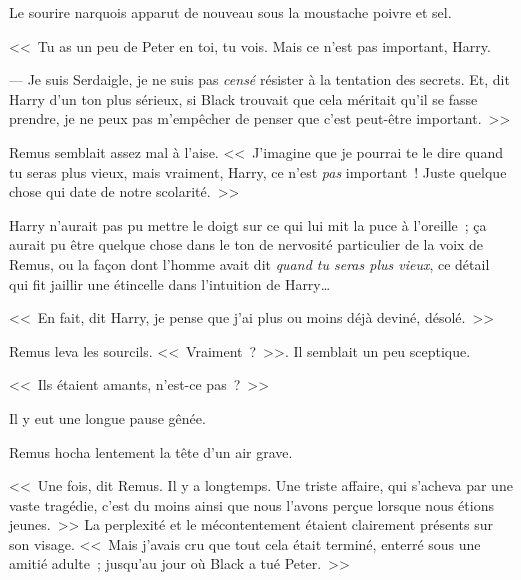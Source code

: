 Le sourire narquois apparut de nouveau sous la moustache poivre et sel.

<<~Tu as un peu de Peter en toi, tu vois. Mais ce n'est pas important, Harry.

--- Je suis Serdaigle, je ne suis pas \emph{censé} résister à la tentation des secrets. Et, dit Harry d'un ton plus sérieux, si Black trouvait que cela méritait qu'il se fasse prendre, je ne peux pas m'empêcher de penser que c'est peut-être important.~>>

Remus semblait assez mal à l'aise. <<~J'imagine que je pourrai te le dire quand tu seras plus vieux, mais vraiment, Harry, ce n'est \emph{pas} important~! Juste quelque chose qui date de notre scolarité.~>>

Harry n'aurait pas pu mettre le doigt sur ce qui lui mit la puce à l'oreille~; ça aurait pu être quelque chose dans le ton de nervosité particulier de la voix de Remus, ou la façon dont l'homme avait dit \emph{quand tu seras plus vieux}, ce détail qui fit jaillir une étincelle dans l'intuition de Harry…

<<~En fait, dit Harry, je pense que j'ai plus ou moins déjà deviné, désolé.~>>

Remus leva les sourcils. <<~Vraiment~?~>>. Il semblait un peu sceptique.

<<~Ils étaient amants, n'est-ce pas~?~>>

Il y eut une longue pause gênée.

Remus hocha lentement la tête d'un air grave.

<<~Une fois, dit Remus. Il y a longtemps. Une triste affaire, qui s'acheva par une vaste tragédie, c'est du moins ainsi que nous l'avons perçue lorsque nous étions jeunes.~>> La perplexité et le mécontentement étaient clairement présents sur son visage. <<~Mais j'avais cru que tout cela était terminé, enterré sous une amitié adulte~; jusqu'au jour où Black a tué Peter.~>>
